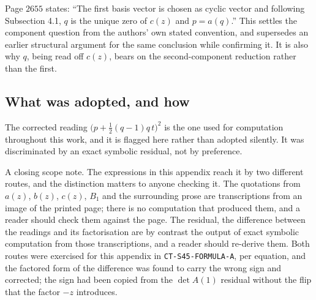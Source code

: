\begin{remark}
Page $2655$ states: ``The first basis vector is chosen as cyclic vector and
following Subsection 4.1, $q$ is the unique zero of $c(z)$ and $p=a(q)$.'' This
settles the component question from the authors' own stated convention, and
supersedes an earlier structural argument for the same conclusion while
confirming it. It is also why $q$, being read off $c(z)$, bears on the
second-component reduction rather than the first.
\end{remark}

\subsection{What was adopted, and how}\label{ssec:typo-adopted}

\begin{remark}
The corrected reading $\bigl(p+\tfrac12(q-1)q\,t\bigr)^{2}$ is the one used for
computation throughout this work, and it is flagged here rather than adopted
silently. It was discriminated by an exact symbolic residual, not by
preference.
\end{remark}

A closing scope note. The expressions in this appendix reach it by two
different routes, and the distinction matters to anyone checking it. The
quotations from $a(z)$, $b(z)$, $c(z)$, $B_1$ and the surrounding prose are
transcriptions from an image of the printed page; there is no computation that
produced them, and a reader should check them against the page. The residual,
the difference between the readings and its factorisation are by contrast the
output of exact symbolic computation from those transcriptions, and a reader
should re-derive them. Both routes were exercised for this appendix in
\texttt{CT-S45-FORMULA-A}, per equation, and the factored form of the
difference was found to carry the wrong sign and corrected; the sign had been
copied from the $\det A(1)$ residual without the flip that the factor $-z$
introduces.
